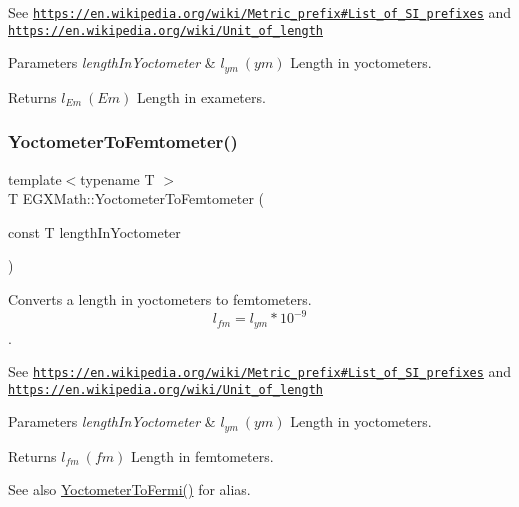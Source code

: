 See \href{https://en.wikipedia.org/wiki/Metric_prefix#List_of_SI_prefixes}{\tt https\+://en.\+wikipedia.\+org/wiki/\+Metric\+\_\+prefix\#\+List\+\_\+of\+\_\+\+S\+I\+\_\+prefixes} and \href{https://en.wikipedia.org/wiki/Unit_of_length}{\tt https\+://en.\+wikipedia.\+org/wiki/\+Unit\+\_\+of\+\_\+length} 
\begin{DoxyParams}{Parameters}
{\em length\+In\+Yoctometer} & $ l_{ym}\ (ym)$ Length in yoctometers. \\
\hline
\end{DoxyParams}
\begin{DoxyReturn}{Returns}
$ l_{Em}\ (Em)$ Length in exameters. 
\end{DoxyReturn}
\mbox{\label{group___e_g_x_math-_conversions-_length_conversions-_s_i-_yoctometer-_s_i_ga2e4981232314be21ccfbe019886c5048}} 
\subsubsection{\texorpdfstring{Yoctometer\+To\+Femtometer()}{YoctometerToFemtometer()}}
{\footnotesize\ttfamily template$<$typename T $>$ \\
T E\+G\+X\+Math\+::\+Yoctometer\+To\+Femtometer (\begin{DoxyParamCaption}\item[{const T}]{length\+In\+Yoctometer }\end{DoxyParamCaption})}



Converts a length in yoctometers to femtometers. \[ l_{fm}=l_{ym} * 10^{-9} \]. 

See \href{https://en.wikipedia.org/wiki/Metric_prefix#List_of_SI_prefixes}{\tt https\+://en.\+wikipedia.\+org/wiki/\+Metric\+\_\+prefix\#\+List\+\_\+of\+\_\+\+S\+I\+\_\+prefixes} and \href{https://en.wikipedia.org/wiki/Unit_of_length}{\tt https\+://en.\+wikipedia.\+org/wiki/\+Unit\+\_\+of\+\_\+length} 
\begin{DoxyParams}{Parameters}
{\em length\+In\+Yoctometer} & $ l_{ym}\ (ym)$ Length in yoctometers. \\
\hline
\end{DoxyParams}
\begin{DoxyReturn}{Returns}
$ l_{fm}\ (fm)$ Length in femtometers. 
\end{DoxyReturn}
\begin{DoxySeeAlso}{See also}
\mbox{\hyperlink{group___e_g_x_math-_conversions-_length_conversions-_s_i-_yoctometer-_non-_s_i_gadcf3b93b00bf0d160f27d3a1a4b8ed9f}{Yoctometer\+To\+Fermi()}} for alias. 
\end{DoxySeeAlso}
\mbox{\label{group___e_g_x_math-_conversions-_length_conversions-_s_i-_yoctometer-_s_i_ga48f8e5df818edfde1006bf08ebdeee33}} 
